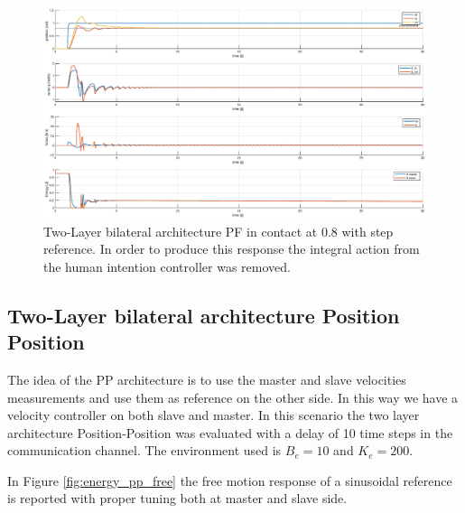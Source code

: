 \documentclass[a4paper,12pt]{article}
\begin{document}
\begin{figure}[H]
    \begin{center}
        \hspace*{-4.5cm}
        \includegraphics[scale=0.5]{images/energy_pf_step.eps}
    \end{center}
    \caption{Two-Layer bilateral architecture PF in contact at 0.8 with step reference. In order to produce this response the integral action from the human intention controller was removed.}
    \label{fig:energy_pf_step}
\end{figure}

\newpage
\subsection{Two-Layer bilateral architecture Position Position}
The idea of the PP architecture is to use the master and slave velocities measurements and use them as reference on the other side. In this way we have a velocity controller on both slave and master. In this scenario the two layer architecture Position-Position was evaluated with a delay of 10 time steps in the communication channel. The environment used is $B_e = 10$ and $K_e = 200$. 

\bigskip
In Figure \ref{fig:energy_pp_free} the free motion response of a sinusoidal reference is reported with proper tuning both at master and slave side.
\end{document}
